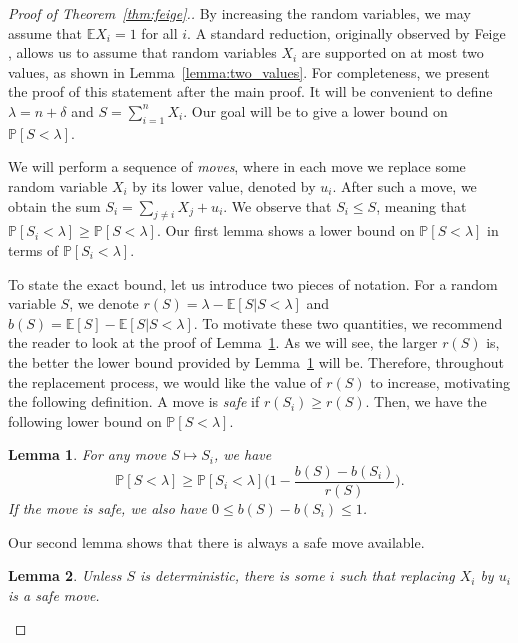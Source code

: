 \documentclass[10pt,a4paper]{article}
\newtheorem{lemma}{Lemma}
\newcommand{\bE}{\mathbb{E}}
\newcommand{\Pb}{\mathbb P}
\begin{document}
\begin{proof}[Proof of Theorem~\ref{thm:feige}.]
By increasing the random variables, we may assume that $\bE X_i=1$ for all $i$.
A standard reduction, originally observed by Feige \cite{F06}, allows us to assume that random variables $X_i$ are supported on at most two values, as shown in Lemma~\ref{lemma:two_values}. For completeness, we present the proof of this statement after the main proof. It will be convenient to define $\lambda=n+\delta$ and $S=\sum_{i=1}^n X_i$. Our goal will be to give a lower bound on $\Pb[S<\lambda]$.

We will perform a sequence of \textit{moves}, where in each move we replace some random variable $X_i$ by its lower value, denoted by $u_i$. After such a move, we obtain the sum $S_i=\sum_{j\neq i} X_j + u_i$. We observe that $S_i\leq S$, meaning that $\Pb[S_i<\lambda]\geq \Pb[S<\lambda]$. Our first lemma shows a lower bound on $\Pb[S<\lambda]$ in terms of $\Pb[S_i<\lambda]$. 

To state the exact bound, let us introduce two pieces of notation. For a random variable $S$, we denote $r(S)=\lambda-\bE[S|S<\lambda]$ and $b(S)=\bE[S]-\bE[S|S<\lambda]$. To motivate these two quantities, we recommend the reader to look at the proof of Lemma~\ref{lemma:lower_bound}. As we will see, the larger $r(S)$ is, the better the lower bound provided by Lemma~\ref{lemma:lower_bound} will be. Therefore, throughout the replacement process, we would like the value of $r(S)$ to increase, motivating the following definition. A move is \textit{safe} if $r(S_i)\geq r(S)$. Then, we have the following lower bound on $\Pb[S<\lambda]$.

\begin{lemma}\label{lemma:lower_bound}
For any move $S\mapsto S_i$, we have
\vspace{-0.1cm}
\begin{equation}\label{eq:lower_bound}
\Pb[S<\lambda]\ge \Pb[S_i<\lambda]\Big(1-\frac{b(S)-b(S_i)}{r(S)}\Big).
\end{equation}
If the move is safe, we also have $0\leq b(S)-b(S_i)\leq 1$.
\end{lemma}

Our second lemma shows that there is always a safe move available.

\begin{lemma}\label{lemma:safe_move}
Unless $S$ is deterministic, there is some $i$ such that replacing $X_i$ by $u_i$ is a safe move.
\end{lemma}
 

\end{proof}
\end{document}
